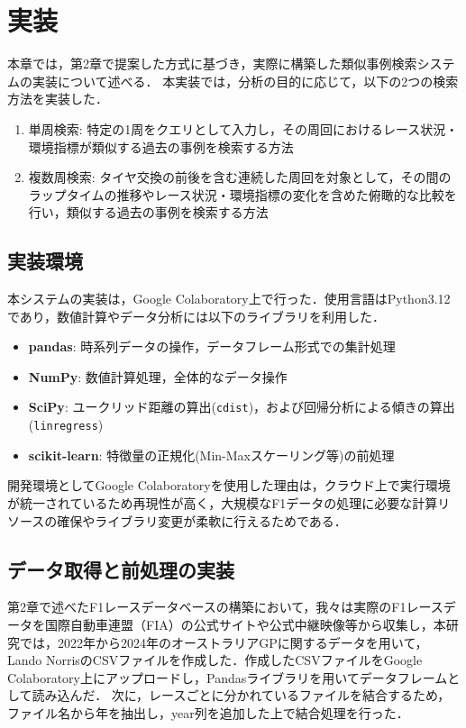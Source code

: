 \documentclass{deimj}
\begin{document}
\section{実装}

本章では，第2章で提案した方式に基づき，実際に構築した類似事例検索システムの実装について述べる．
本実装では，分析の目的に応じて，以下の2つの検索方法を実装した．
\begin{enumerate}
  \item 単周検索: 特定の1周をクエリとして入力し，その周回におけるレース状況・環境指標が類似する過去の事例を検索する方法
  \item 複数周検索: タイヤ交換の前後を含む連続した周回を対象として，その間のラップタイムの推移やレース状況・環境指標の変化を含めた俯瞰的な比較を行い，類似する過去の事例を検索する方法
\end{enumerate}

\subsection{実装環境}

本システムの実装は，Google Colaboratory上で行った．使用言語はPython3.12であり，数値計算やデータ分析には以下のライブラリを利用した．

\begin{itemize}
  \item \textbf{pandas}: 時系列データの操作，データフレーム形式での集計処理
  \item \textbf{NumPy}: 数値計算処理，全体的なデータ操作
  \item \textbf{SciPy}: ユークリッド距離の算出(\texttt{cdist})，および回帰分析による傾きの算出(\texttt{linregress})
  \item \textbf{scikit-learn}: 特徴量の正規化(Min-Maxスケーリング等)の前処理
\end{itemize}
開発環境としてGoogle Colaboratoryを使用した理由は，クラウド上で実行環境が統一されているため再現性が高く，大規模なF1データの処理に必要な計算リソースの確保やライブラリ変更が柔軟に行えるためである．

\subsection{データ取得と前処理の実装}

第2章で述べたF1レースデータベースの構築において，我々は実際のF1レースデータを国際自動車連盟（FIA）の公式サイトや公式中継映像等から収集し，本研究では，2022年から2024年のオーストラリアGPに関するデータを用いて，Lando NorrisのCSVファイルを作成した．作成したCSVファイルをGoogle Colaboratory上にアップロードし，Pandasライブラリを用いてデータフレームとして読み込んだ．
次に，レースごとに分かれているファイルを結合するため，ファイル名から年を抽出し，year列を追加した上で結合処理を行った．
\end{document}

